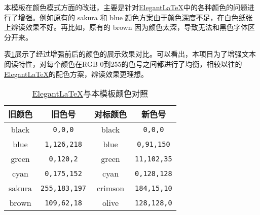 本模板在颜色模式方面的改进，主要是针对\href{https://github.com/ElegantLaTeX/}{Elegant\LaTeX}中的各种颜色的问题进行了增强。例如原有的 \textcolor{elegantsakura}{sakura} 和 \textcolor{elegantblue}{blue} 颜色方案由于颜色深度不足，在白色纸张上辨读效果不好。再比如，原有的 \textcolor{elegantbrown}{brown} 因为颜色太深，导致无法和黑色字体区分开来。

表\ref{tab:colors}展示了经过增强前后的颜色的展示效果对比。可以看出，本项目为了增强文本阅读特性，对每个颜色在RGB 0到255的色号之间都进行了均衡，相较以往的\href{https://github.com/ElegantLaTeX/}{Elegant\LaTeX}的配色方案，辨读效果更理想。

\begin{table}[!h]
  \centering
  \caption{\href{https://github.com/ElegantLaTeX/}{Elegant\LaTeX}与本模板颜色对照}%
  \label{tab:colors}
  \begin{tabular}{c c c c}
    \toprule
    旧颜色 & 旧色号 & 对标颜色 & 新色号 \\
    \midrule
    \textcolor{elegantblack}{black} & \texttt{0,0,0} & \textcolor{eblack}{black} & \texttt{0,0,0} \\
    \textcolor{elegantblue}{blue} & \texttt{1,126,218} & \textcolor{eblue}{blue} & \texttt{0,91,150} \\
    \textcolor{elegantgreen}{green} & \texttt{0,120,2} & \textcolor{egreen}{green} & \texttt{11,102,35} \\
    \textcolor{elegantcyan}{cyan} & \texttt{0,175,152} & \textcolor{ecyan}{cyan} & \texttt{0,128,128} \\
    \textcolor{elegantsakura}{sakura} & \texttt{255,183,197} & \textcolor{ecrimson}{crimson} & \texttt{184,15,10} \\
    \textcolor{elegantbrown}{brown} & \texttt{109,62,18} & \textcolor{eolive}{olive} & \texttt{128,128,0} \\
    \bottomrule
  \end{tabular}
\end{table}